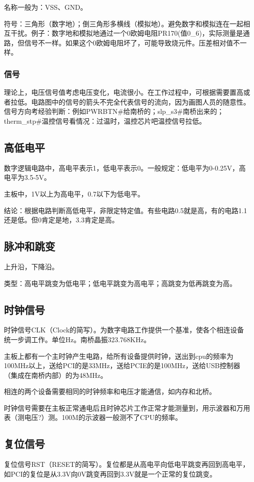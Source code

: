 名称一般为：VSS、GND。

符号：三角形（数字地）；倒三角形多横线（模拟地）。避免数字和模拟连在一起相互干扰。例子：数字地和模拟地通过一个0欧姆电阻PR170(值0\_6)，实际测量是通路，但信号不一样。如果这个0欧姆电阻坏了，可能导致烧元件。压差相对值不一样。

\subsubsection{信号}
理论上，电压信号值考虑电压变化，电流很小。在工作过程中，可根据需要置高或者拉低。电路图中的信号的箭头不完全代表信号的流向，因为画图人员的随意性。
信号方向考经验判断：例如PWRBTN\#给南桥的；slp\_s3\#南桥出来的；therm\_stp\#温控信号看情况：过温时，温控芯片吧温控信号拉低。

\subsection{高低电平}
数字逻辑电路中，高电平表示1，低电平表示0。一般规定：低电平为0-0.25V，高电平为3.5-5V。

主板中，1V以上为高电平，0.7以下为低电平。

结论：根据电路判断高低电平，非限定特定值。有些电路0.5就是高，有的电路1.1还是低。但0肯定是地，3.3肯定是高。

\subsection{脉冲和跳变}
上升沿，下降沿。

类型：高电平跳变为低电平；低电平跳变为高电平；高跳变为低再跳变为高。

\subsection{时钟信号}
时钟信号CLK（Clock的简写）。为数字电路工作提供一个基准，使各个相连设备统一步调工作。单位Hz。南桥晶振323.768KHz。

主板上都有一个主时钟产生电路，给所有设备提供时钟，送出到cpu的频率为100MHz以上，送给PCI的是33MHz，送给PCIE的是100MHz，送给USB控制器（集成在南桥内部）的为48MHz。

相连的两个设备需要相同的时钟频率和电压才能通信，如内存和北桥。

时钟信号需要在主板正常通电后且时钟芯片工作正常才能测量到，用示波器和万用表（测电压?）测。100M的示波器一般测不了CPU的频率。

\subsection{复位信号}
复位信号RST（RESET的简写）。复位都是从高电平向低电平跳变再回到高电平，如PCI的复位是从3.3V向0V跳变再回到3.3V就是一个正常的复位跳变。

